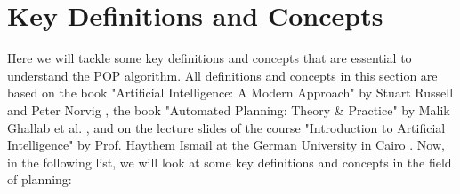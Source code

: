 \section{Key Definitions and Concepts}\label{sec:key_definitions}
Here we will tackle some key definitions and concepts that are essential to understand the \ac{POP} algorithm.
All definitions and concepts in this section are based on the book "Artificial Intelligence: A Modern Approach" by Stuart Russell and Peter Norvig \cite{RN2020}, the book "Automated Planning: Theory \& Practice" by Malik Ghallab et al. \cite{10.5555/975615}, and on the lecture slides of the course "Introduction to Artificial Intelligence" by Prof. Haythem Ismail at the German University in Cairo \cite{Ismail2023}.
Now, in the following list, we will look at some key definitions and concepts in the field of planning:
